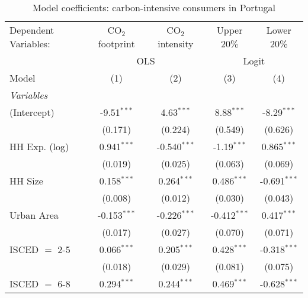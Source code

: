 
\begin{table}[htbp!]
   \centering
   \small
   \begin{adjustbox}{width = 1\textwidth, max height = 0.95\textheight, center}
      \begin{threeparttable}[b]
         \caption{\label{tab:Logit_1_PRT} Model coefficients: carbon-intensive consumers in Portugal}
         \begin{tabular}{lcccc}
            \tabularnewline \midrule \midrule
            Dependent Variables: & CO$_{2}$ footprint & CO$_{2}$ intensity & Upper 20\%     & Lower 20\%\\   
             & \multicolumn{2}{c}{OLS} & \multicolumn{2}{c}{Logit} \\ 
            Model                & (1)                & (2)                & (3)            & (4)\\  
            \midrule
            \emph{Variables}\\
            (Intercept)          & -9.51$^{***}$      & 4.63$^{***}$       & 8.88$^{***}$   & -8.29$^{***}$\\   
                                 & (0.171)            & (0.224)            & (0.549)        & (0.626)\\   
            HH Exp. (log)        & 0.941$^{***}$      & -0.540$^{***}$     & -1.19$^{***}$  & 0.865$^{***}$\\   
                                 & (0.019)            & (0.025)            & (0.063)        & (0.069)\\   
            HH Size              & 0.158$^{***}$      & 0.264$^{***}$      & 0.486$^{***}$  & -0.691$^{***}$\\   
                                 & (0.008)            & (0.012)            & (0.030)        & (0.043)\\   
            Urban Area           & -0.153$^{***}$     & -0.226$^{***}$     & -0.412$^{***}$ & 0.417$^{***}$\\   
                                 & (0.017)            & (0.027)            & (0.070)        & (0.071)\\   
            ISCED $=$ 2-5        & 0.066$^{***}$      & 0.205$^{***}$      & 0.428$^{***}$  & -0.318$^{***}$\\   
                                 & (0.018)            & (0.029)            & (0.081)        & (0.075)\\   
            ISCED $=$ 6-8        & 0.294$^{***}$      & 0.244$^{***}$      & 0.469$^{***}$  & -0.628$^{***}$\\   

\end{tabular}
\end{threeparttable}
\end{adjustbox}
\end{table}
